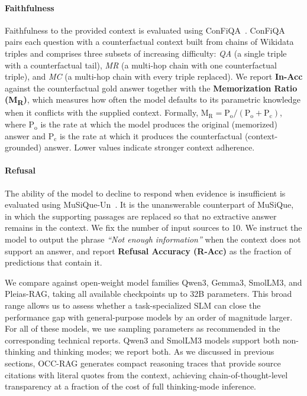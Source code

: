 \documentclass{llmxive}
\begin{document}
\paragraph{Faithfulness} Faithfulness to the provided context is evaluated using ConFiQA~\citep{bi-etal-2025-context}. ConFiQA pairs each question with a counterfactual context built from chains of Wikidata triples and comprises three subsets of increasing difficulty: \textit{QA} (a single triple with a counterfactual tail), \textit{MR} (a multi-hop chain with one counterfactual triple), and \textit{MC} (a multi-hop chain with every triple replaced). We report \textbf{In-Acc} against the counterfactual gold answer together with the \textbf{Memorization Ratio (M\textsubscript{R})}, which measures how often the model defaults to its parametric knowledge when it conflicts with the supplied context. Formally, $\text{M}_\text{R} = \text{P}_\text{o} / (\text{P}_\text{o} + \text{P}_\text{c})$, where $\text{P}_\text{o}$ is the rate at which the model produces the original (memorized) answer and $\text{P}_\text{c}$ is the rate at which it produces the counterfactual (context-grounded) answer. Lower values indicate stronger context adherence.

\paragraph{Refusal} The ability of the model to decline to respond when evidence is insufficient is evaluated using MuSiQue-Un~\citep{musique}. It is the unanswerable counterpart of MuSiQue, in which the supporting passages are replaced so that no extractive answer remains in the context. We fix the number of input sources to 10. We instruct the model to output the phrase \textit{``Not enough information''} when the context does not support an answer, and report \textbf{Refusal Accuracy (R-Acc)} as the fraction of predictions that contain it.

We compare against open-weight model families Qwen3, Gemma3, SmolLM3, and Pleias-RAG, taking all available checkpoints up to 32B parameters. This broad range allows us to assess whether a task-specialized SLM can close the performance gap with general-purpose models by an order of magnitude larger. For all of these models, we use sampling parameters as recommended in the corresponding technical reports. Qwen3 and SmolLM3 models support both non-thinking and thinking modes; we report both. As we discussed in previous sections, OCC-RAG generates compact reasoning traces that provide source citations with literal quotes from the context, achieving chain-of-thought-level transparency at a fraction of the cost of full thinking-mode inference.
\end{document}
